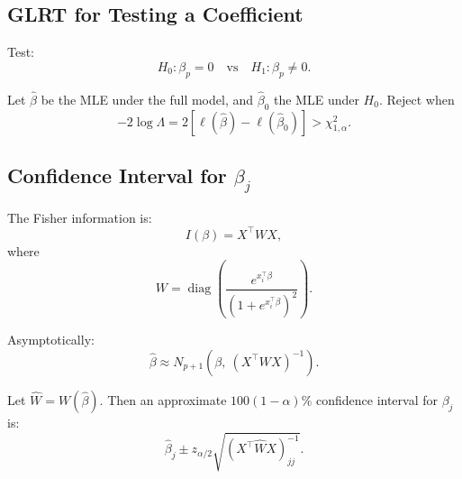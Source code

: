 \subsection{GLRT for Testing a Coefficient}

Test:
\[
    H_0: \beta_p = 0 \quad \text{vs} \quad H_1: \beta_p \neq 0.
\]

Let $\hat{\beta}$ be the MLE under the full model, and $\hat{\beta}_0$ the MLE under $H_0$.
Reject when
\[
    -2 \log \Lambda
    = 2\left[
        \ell(\hat{\beta})
        - \ell(\hat{\beta}_0)
      \right]
    > \chi^2_{1,\alpha}.
\]

\subsection{Confidence Interval for $\beta_j$}

The Fisher information is:
\[
    I(\beta)
    = X^{\top} W X,
\]
where
\[
    W = \operatorname{diag}\left(
        \frac{e^{x_i^{\top} \beta}}
             {(1 + e^{x_i^{\top}\beta})^2}
    \right).
\]

Asymptotically:
\[
    \hat{\beta} \approx
    N_{p+1}\left(\beta,\ (X^{\top}WX)^{-1}\right).
\]

Let $\hat{W} = W(\hat{\beta})$. Then an approximate  
$100(1 - \alpha)\%$ confidence interval for $\beta_j$ is:
\[
    \hat{\beta}_j \pm
    z_{\alpha/2}
    \sqrt{(X^{\top} \hat{W} X)^{-1}_{jj}}.
\]

\newpage